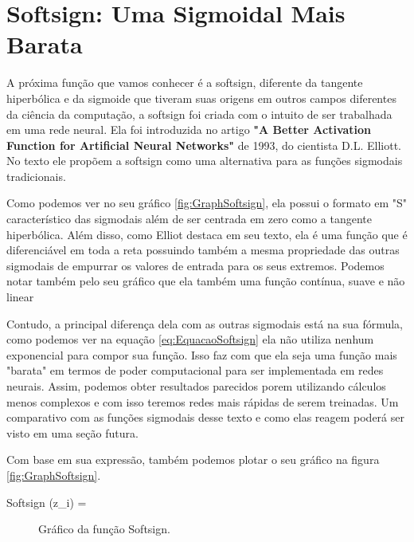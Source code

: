 \section{Softsign: Uma Sigmoidal Mais Barata}

A próxima função que vamos conhecer é a softsign, diferente da tangente hiperbólica e da sigmoide que tiveram suas origens em outros campos diferentes da ciência da computação, a softsign foi criada com o intuito de ser trabalhada em uma rede neural. Ela foi introduzida no artigo \textbf{"A Better Activation Function for Artificial Neural Networks"} de 1993, do cientista D.L. Elliott. No texto ele propõem a softsign como uma alternativa para as funções sigmodais tradicionais.

Como podemos ver no seu gráfico \ref{fig:GraphSoftsign}, ela possui o formato em "S" característico das sigmodais além de ser centrada em zero como a tangente hiperbólica. Além disso, como Elliot destaca em seu texto, ela é uma função que é diferenciável em toda a reta possuindo também a mesma propriedade das outras sigmodais de empurrar os valores de entrada para os seus extremos. Podemos notar também pelo seu gráfico que ela também uma função contínua, suave e não linear

Contudo, a principal diferença dela com as outras sigmodais está na sua fórmula, como podemos ver na equação \ref{eq:EquacaoSoftsign} ela não utiliza nenhum exponencial para compor sua função. Isso faz com que ela seja uma função mais "barata" em termos de poder computacional para ser implementada em redes neurais. Assim, podemos obter resultados parecidos porem utilizando cálculos menos complexos e com isso teremos redes mais rápidas de serem treinadas. Um comparativo com as funções sigmodais desse texto e como elas reagem poderá ser visto em uma seção futura.

Com base em sua expressão, também podemos plotar o seu gráfico na figura \ref{fig:GraphSoftsign}.

\begin{equacaodestaque}{Softsign}
    (z_i) = 
    \label{eq:softsign}
\end{equacaodestaque}

\begin{figure}[h!]
    \centering
    \caption{Gráfico da função Softsign.}
\end{figure}

